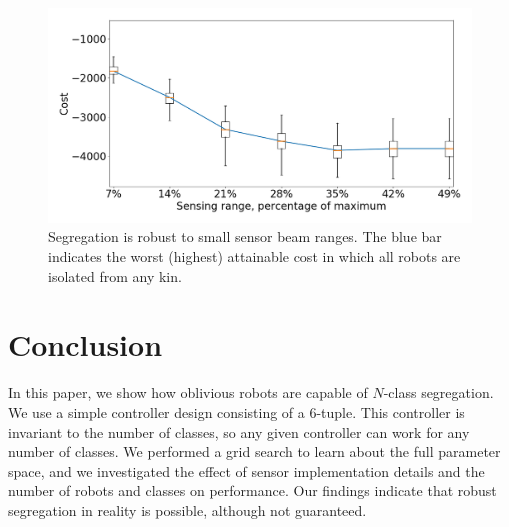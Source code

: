 \documentclass[letterpaper, 10 pt, conference]{ieeeconf}
\begin{document}
\begin{figure}[t]
  \centering
  \includegraphics[width=1\linewidth]{./images/beam_length.png}
  \caption{Segregation is robust to small sensor beam ranges. The blue bar
    indicates the worst (highest) attainable cost in which all robots are
    isolated from any kin.}
  \label{fig:beam_range}
\end{figure}

\section{Conclusion}

In this paper, we show how oblivious robots are capable of $N$-class
segregation. We use a simple controller design consisting of a 6-tuple. This
controller is invariant to the number of classes, so any given controller can
work for any number of classes. We performed a grid search to learn about the
full parameter space, and we investigated the effect of sensor implementation
details and the number of robots and classes on performance. Our findings
indicate that robust segregation in reality is possible, although not
guaranteed.



\end{document}
